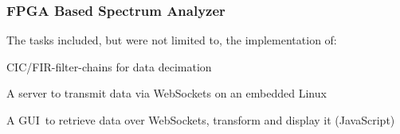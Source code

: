 \begin{timeline}
    \subsubsection{FPGA Based Spectrum Analyzer}
    The tasks included, but were not limited to, the implementation of:
    \begin{tightemize}
    \item CIC/FIR-filter-chains for data decimation
    \item A server to transmit data via WebSockets on an embedded Linux
    \item A GUI to retrieve data over WebSockets, transform and display it (JavaScript)
    \end{tightemize}
    \sectionsep
    

    \end{timeline}%